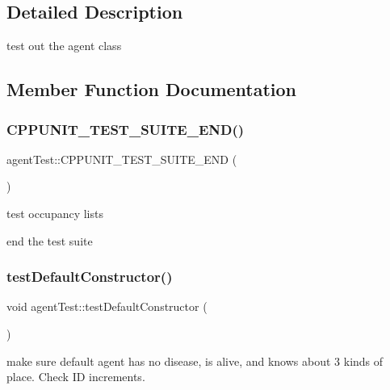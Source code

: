 \subsection{Detailed Description}
test out the agent class 

\subsection{Member Function Documentation}
\mbox{\label{classagentTest_a51ff7b623cb89bce6fa8bab5f8af04b7}} 
\subsubsection{\texorpdfstring{C\+P\+P\+U\+N\+I\+T\+\_\+\+T\+E\+S\+T\+\_\+\+S\+U\+I\+T\+E\+\_\+\+E\+N\+D()}{CPPUNIT\_TEST\_SUITE\_END()}}
{\footnotesize\ttfamily agent\+Test\+::\+C\+P\+P\+U\+N\+I\+T\+\_\+\+T\+E\+S\+T\+\_\+\+S\+U\+I\+T\+E\+\_\+\+E\+ND (\begin{DoxyParamCaption}{ }\end{DoxyParamCaption})}



test occupancy lists 

end the test suite \mbox{\label{classagentTest_ade6fc2895d439529b21d4fb725302b77}} 
\subsubsection{\texorpdfstring{test\+Default\+Constructor()}{testDefaultConstructor()}}
{\footnotesize\ttfamily void agent\+Test\+::test\+Default\+Constructor (\begin{DoxyParamCaption}{ }\end{DoxyParamCaption})\hspace{0.3cm}{\ttfamily [inline]}}



make sure default agent has no disease, is alive, and knows about 3 kinds of place. Check ID increments. 

